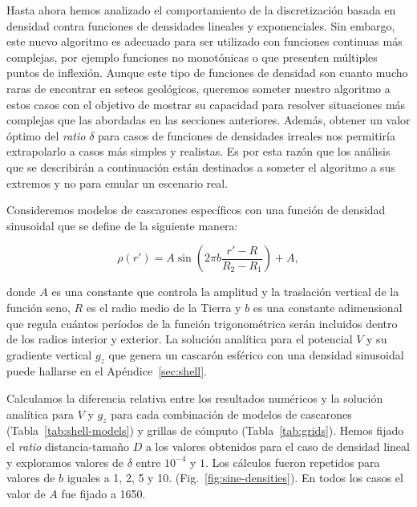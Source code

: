 Hasta ahora hemos analizado el comportamiento de la discretización basada en
densidad contra funciones de densidades lineales y exponenciales.
Sin embargo, este nuevo algoritmo es adecuado para ser utilizado con funciones
continuas más complejas, por ejemplo funciones no monotónicas o que presenten
múltiples puntos de inflexión.
Aunque este tipo de funciones de densidad son cuanto mucho raras de encontrar
en seteos geológicos, queremos someter nuestro algoritmo a estos casos con el
objetivo de mostrar su capacidad para resolver situaciones más complejas que
las abordadas en las secciones anteriores.
Además, obtener un valor óptimo del \emph{ratio} $\delta$ para casos de
funciones de densidades irreales nos permitiría extrapolarlo a casos más
simples y realistas.
Es por esta razón que los análisis que se describirán a continuación están
destinados a someter el algoritmo a sus extremos y no para emular un escenario
real.

Consideremos modelos de cascarones específicos con una función de densidad
sinusoidal que se define de la siguiente manera:

\begin{equation}
    \rho(r') = A \sin \left( 2 \pi b \frac{r' - R}{R_2 - R_1} \right) + A,
    \label{eq:density-sine}
\end{equation}

\noindent donde $A$ es una constante que controla la amplitud y la traslación
vertical de la función seno, $R$ es el radio medio de la Tierra y $b$ es una
constante adimensional que regula cuántos períodos de la función trigonométrica
serán incluidos dentro de los radios interior y exterior.
La solución analítica para el potencial $V$ y su gradiente vertical $g_z$ que
genera un cascarón esférico con una densidad sinusoidal puede hallarse en el
Apéndice~\ref{sec:shell}.

Calculamos la diferencia relativa entre los resultados numéricos y la solución
analítica para $V$ y $g_z$ para cada combinación de modelos de cascarones
(Tabla~\ref{tab:shell-models}) y grillas de cómputo (Tabla~\ref{tab:grids}).
Hemos fijado el \emph{ratio} distancia-tamaño $D$ a los valores obtenidos para
el caso de densidad lineal y exploramos valores de $\delta$ entre $10^{-4}$
y $1$.
Los cálculos fueron repetidos para valores de $b$ iguales a 1, 2, 5 y 10.
(Fig.~\ref{fig:sine-densities}). En todos los casos el valor de $A$ fue fijado
a 1650\kgpercubicm{}.

